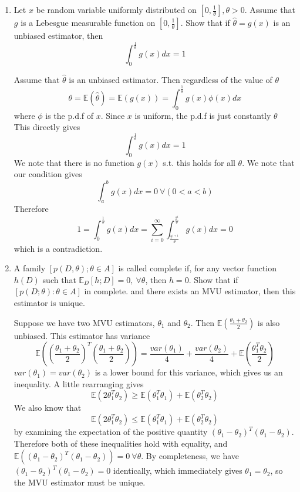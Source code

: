 \documentclass{article}
\newcommand{\chapternumber}{3}
\newenvironment{QandA}{\begin{enumerate}[label=\chapternumber.\arabic*]\bfseries\boldmath}
	{\end{enumerate}}
\newenvironment{answered}{\par\bigskip\normalfont\unboldmath}{}
\begin{document}
\begin{QandA}
		\item Let $x$ be random variable uniformly distributed on $[0,\frac{1}{\theta}],\theta>0$. Assume that $g$ is a Lebesgue measurable function on $[0,\frac{1}{\theta}]$. Show that if $\hat{\theta}=g(x)$ is an unbiased estimator, then
		\[\int_0^\frac{1}{\theta}g(x)dx=1\]
		\begin{answered}
			Assume that $\hat{\theta}$ is an unbiased estimator. Then regardless of the value of $\theta$
			\[\theta=\mathbb{E}(\hat{\theta})=\mathbb{E}(g(x))=\int_0^\frac{1}{\theta}g(x)\phi(x)dx\]
			where $\phi$ is the p.d.f of $x$. Since $x$ is uniform, the p.d.f is just constantly $\theta$ This directly gives 
			\[\int_0^\frac{1}{\theta}g(x)dx=1\] We note that there is no function $g(x)$ s.t. this holds for all $\theta$. We note that our condition gives 
			\[\int_a^bg(x)dx=0\ \forall (0<a<b)\] Therefore
			\[1=\int_0^\frac{1}{\theta}g(x)dx=\sum_{i=0}^\infty\int_\frac{2^{i+1}}{\theta}^\frac{2^i}{\theta}g(x)dx=0 \]
			which is a contradiction.
		\end{answered}
	
		\item A family $[p(D,\theta);\theta\in A]$ is called complete if, for any vector function $h(D)$ such that $\mathbb{E}_D[h;D]=0,\ \forall\theta$, then $h=0$. Show that if $[p(D;\theta):\theta\in A]$ in complete. and there exists an MVU estimator, then this estimator is unique.
		\begin{answered}
			Suppose we have two MVU estimators, $\theta_1$ and $\theta_2$. Then $\mathbb{E}\left(\frac{\theta_1+\theta_2}{2}\right)$ is also unbiased. This estimator has variance
			\[\mathbb{E}\left(\left(\frac{\theta_1+\theta_2}{2}\right)^T\left(\frac{\theta_1+\theta_2}{2}\right)\right)=\frac{var(\theta_1)}{4}+\frac{var(\theta_2)}{4}+\mathbb{E}\left(\frac{\theta_1^T\theta_2}{2}\right)\]
			$var(\theta_1)=var(\theta_2)$ is a lower bound for this variance, which gives us an inequality. A little rearranging gives
			\[\mathbb{E}(2\theta_1^T\theta_2)\geq\mathbb{E}(\theta_1^T\theta_1)+\mathbb{E}(\theta_2^T\theta_2)\]
			We also know that
			\[\mathbb{E}(2\theta_1^T\theta_2)\leq\mathbb{E}(\theta_1^T\theta_1)+\mathbb{E}(\theta_2^T\theta_2)\]
			by examining the expectation of the positive quantity $(\theta_1-\theta_2)^T(\theta_1-\theta_2)$. Therefore both of these inequalities hold with equality, and $\mathbb{E}((\theta_1-\theta_2)^T(\theta_1-\theta_2))=0\ \forall \theta$. By completeness, we have $(\theta_1-\theta_2)^T(\theta_1-\theta_2)=0$ identically, which immediately gives $\theta_1=\theta_2$, so the MVU estimator must be unique.
		\end{answered}
	

\end{QandA}
\end{document}

